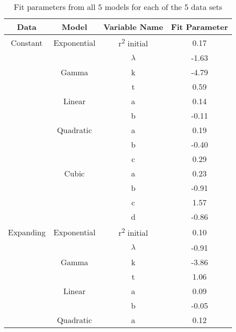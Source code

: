 \documentclass[11pt]{article}
\begin{document}
\addtocounter{table}{-1}
\begin{longtable}{c c c c}
\caption{Fit parameters from all 5 models for each of the 5 data sets}\label{tab:b}\\
\hline
Data       & Model       & Variable Name              & Fit Parameter \\ 
\hline
\endhead
\hline
\endfoot
Constant   & Exponential & r\textsuperscript2 initial & 0.17          \\ 
           &             & $\lambda$                  & -1.63         \\ 
           & Gamma       & k                          & -4.79         \\ 
           &             & t                          & 0.59          \\  
           & Linear      & a                          & 0.14          \\  
           &             & b                          & -0.11         \\  
           & Quadratic   & a                          & 0.19          \\  
           &             & b                          & -0.40         \\  
           &             & c                          & 0.29          \\  
           & Cubic       & a                          & 0.23          \\  
           &             & b                          & -0.91         \\  
           &             & c                          & 1.57          \\  
           &             & d                          & -0.86         \\  \hline
Expanding  & Exponential & r\textsuperscript2 initial & 0.10          \\  
           &             & $\lambda$                  & -0.91         \\  
           & Gamma       & k                          & -3.86         \\  
           &             & t                          & 1.06          \\  
           & Linear      & a                          & 0.09          \\  
           &             & b                          & -0.05         \\  
           & Quadratic   & a                          & 0.12          \\  

\end{longtable}
\end{document}
